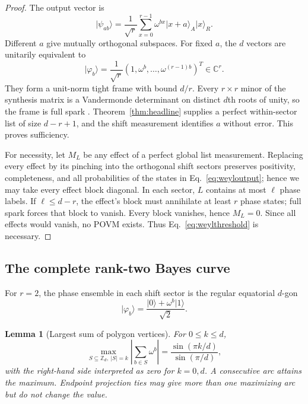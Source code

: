 \documentclass[11pt,a4paper]{article}
\newtheorem{lemma}[theorem]{Lemma}
\newcommand{\C}{\mathbb{C}}
\newcommand{\ket}[1]{\lvert #1\rangle}
\begin{document}
\begin{proof}
The output vector is
\begin{equation}\label{eq:weyloutput}
  \ket{\psi_{ab}}=\frac1{\sqrt r}
  \sum_{x=0}^{r-1}\omega^{bx}\ket{x+a}_A\ket{x}_R.
\end{equation}
Different $a$ give mutually orthogonal subspaces.  For fixed $a$, the $d$
vectors are unitarily equivalent to
\[
  \ket{\varphi_b}=\frac1{\sqrt r}
  (1,\omega^b,\ldots,\omega^{(r-1)b})^T\in\C^r.
\]
They form a unit-norm tight frame with bound $d/r$.  Every $r\times r$ minor
of the synthesis matrix is a Vandermonde determinant on distinct $d$th roots
of unity, so the frame is full spark
\cite{AlexeevCahillMixon2012}.  Theorem~\ref{thm:headline} supplies a perfect
within-sector list of size $d-r+1$, and the shift measurement identifies $a$
without error.  This proves sufficiency.

For necessity, let $M_L$ be any effect of a perfect global list measurement.
Replacing every effect by its pinching into the orthogonal shift sectors
preserves positivity, completeness, and all probabilities of the states in
Eq.~\eqref{eq:weyloutput}; hence we may take every effect block diagonal.  In
each sector, $L$ contains
at most $\ell$ phase labels.  If $\ell\le d-r$, the effect's block must
annihilate at least $r$ phase states; full spark forces that block to vanish.
Every block vanishes, hence $M_L=0$.  Since all effects would vanish, no POVM
exists.  Thus Eq.~\eqref{eq:weylthreshold} is necessary.
\end{proof}

\subsection{The complete rank-two Bayes curve}\label{sec:weylcurve}

For $r=2$, the phase ensemble in each shift sector is the regular equatorial
$d$-gon
\[
 \ket{\varphi_b}=\frac{\ket0+\omega^b\ket1}{\sqrt2}.
\]

\begin{lemma}[Largest sum of polygon vertices]\label{lem:polygon}
For $0\le k\le d$,
\[
 \max_{S\subseteq\mathbb Z_d,\ |S|=k}
 \left|\sum_{b\in S}\omega^b\right|
 =\frac{\sin(\pi k/d)}{\sin(\pi/d)},
\]
with the right-hand side interpreted as zero for $k=0,d$.  A consecutive
arc attains the maximum.  Endpoint projection ties may give more than one
maximizing arc but do not change the value.
\end{lemma}
\end{document}
